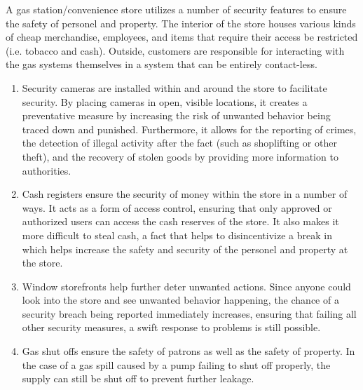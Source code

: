 A gas station/convenience store utilizes a number of security features to ensure the safety of personel and property. The interior of the store houses various kinds of cheap merchandise, employees, and items that require their access be restricted (i.e. tobacco and cash). Outside, customers are responsible for interacting with the gas systems themselves in a system that can be entirely contact-less.
\begin{enumerate}
    \item Security cameras are installed within and around the store to facilitate security. By placing cameras in open, visible locations, it creates a preventative measure by increasing the risk of unwanted behavior being traced down and punished. Furthermore, it allows for the reporting of crimes, the detection of illegal activity after the fact (such as shoplifting or other theft), and the recovery of stolen goods by providing more information to authorities.
    \item Cash registers ensure the security of money within the store in a number of ways. It acts as a form of access control, ensuring that only approved or authorized users can access the cash reserves of the store. It also makes it more difficult to steal cash, a fact that helps to disincentivize a break in which helps increase the safety and security of the personel and property at the store.
    \item Window storefronts help further deter unwanted actions. Since anyone could look into the store and see unwanted behavior happening, the chance of a security breach being reported immediately increases, ensuring that failing all other security measures, a swift response to problems is still possible.
    \item Gas shut offs ensure the safety of patrons as well as the safety of property. In the case of a gas spill caused by a pump failing to shut off properly, the supply can still be shut off to prevent further leakage.
\end{enumerate}

